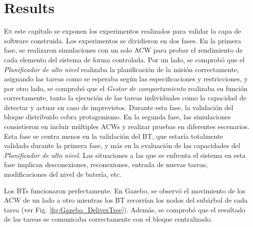 \documentclass[fontsize=11pt, English=false, Español=true, Myfinal=true, twoside, numbers=noenddot]{scrbook}
\begin{document}
\chapter{Results}
\label{ch:Results}
\lettrine[lraise=-0.1, lines=2, loversize=0.2]{E}{n} este capítulo se exponen los experimentos realizados para validar la capa de software construida. Los experimentos se dividieron en dos fases. En la primera fase, se realizaron simulaciones con un solo \gls{ACW} para probar el rendimiento de cada elemento del sistema de forma controlada. Por un lado, se comprobó que el \emph{Planificador de alto nivel} realizaba la planificación de la misión correctamente, asignando las tareas como se esperaba según las especificaciones y restricciones, y por otro lado, se comprobó que el \emph{Gestor de comportamiento} realizaba su función correctamente, tanto la ejecución de las tareas individuales como la capacidad de detectar y actuar en caso de imprevistos. Durante esta fase, la validación del bloque distribuido cobra protagonismo. En la segunda fase, las simulaciones consistieron en incluir múltiples \glspl{ACW} y realizar pruebas en diferentes escenarios. Esta fase se centra menos en la validación del \gls{BT}, que estaría totalmente validado durante la primera fase, y más en la evaluación de las capacidades del \emph{Planificador de alto nivel}. Las situaciones a las que se enfrenta el sistema en esta fase implican desconexiones, reconexiones, entrada de nuevas tareas, modificaciones del nivel de batería, etc.

Los BTs funcionaron perfectamente. En Gazebo, se observó el movimiento de los \gls{ACW} de un lado a otro mientras los \gls{BT} recorrían los nodos del subárbol de cada tarea (ver Fig. \ref{fig:Gazebo_DeliverTree}). Además, se comprobó que el resultado de las tareas se comunicaba correctamente con el bloque centralizado.
\end{document}
